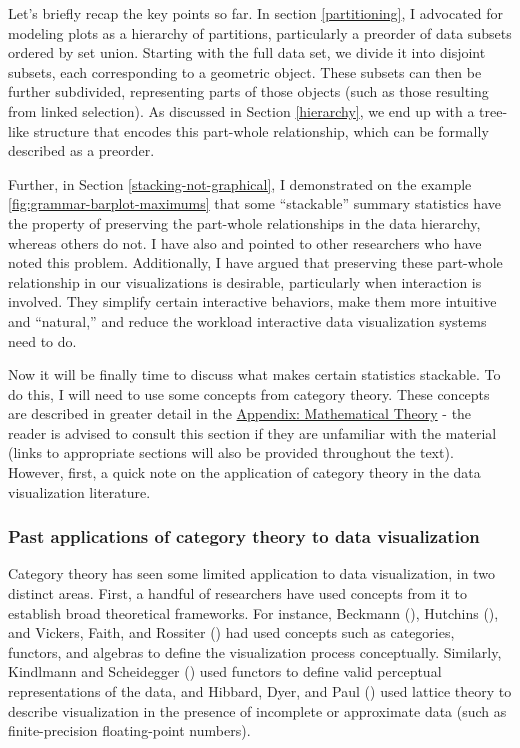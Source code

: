 \documentclass[
  openany]{book}
\theoremstyle{definition}
\theoremstyle{definition}
\theoremstyle{definition}
\theoremstyle{definition}
\theoremstyle{remark}
\begin{document}
Let's briefly recap the key points so far. In section \ref{partitioning}, I advocated for modeling plots as a hierarchy of partitions, particularly a preorder of data subsets ordered by set union. Starting with the full data set, we divide it into disjoint subsets, each corresponding to a geometric object. These subsets can then be further subdivided, representing parts of those objects (such as those resulting from linked selection). As discussed in Section \ref{hierarchy}, we end up with a tree-like structure that encodes this part-whole relationship, which can be formally described as a preorder.

Further, in Section \ref{stacking-not-graphical}, I demonstrated on the example \ref{fig:grammar-barplot-maximums} that some ``stackable'' summary statistics have the property of preserving the part-whole relationships in the data hierarchy, whereas others do not. I have also and pointed to other researchers who have noted this problem. Additionally, I have argued that preserving these part-whole relationship in our visualizations is desirable, particularly when interaction is involved. They simplify certain interactive behaviors, make them more intuitive and ``natural,'' and reduce the workload interactive data visualization systems need to do.

Now it will be finally time to discuss what makes certain statistics stackable. To do this, I will need to use some concepts from category theory. These concepts are described in greater detail in the \hyperref[math]{Appendix: Mathematical Theory} - the reader is advised to consult this section if they are unfamiliar with the material (links to appropriate sections will also be provided throughout the text). However, first, a quick note on the application of category theory in the data visualization literature.

\subsubsection{Past applications of category theory to data visualization}\label{visualization-category-theory}

Category theory has seen some limited application to data visualization, in two distinct areas. First, a handful of researchers have used concepts from it to establish broad theoretical frameworks. For instance, Beckmann (), Hutchins (), and Vickers, Faith, and Rossiter () had used concepts such as categories, functors, and algebras to define the visualization process conceptually. Similarly, Kindlmann and Scheidegger () used functors to define valid perceptual representations of the data, and Hibbard, Dyer, and Paul () used lattice theory to describe visualization in the presence of incomplete or approximate data (such as finite-precision floating-point numbers).
\end{document}
